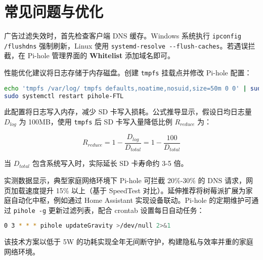 \chapter{常见问题与优化}
广告过滤失效时，首先检查客户端 DNS 缓存。Windows 系统执行 \verb!ipconfig /flushdns! 强制刷新，Linux 使用 \verb!systemd-resolve --flush-caches!。若遇误拦截，在 Pi-hole 管理界面的 \textbf{Whitelist} 添加域名即可。\par
性能优化建议将日志存储于内存磁盘。创建 \verb!tmpfs! 挂载点并修改 Pi-hole 配置：\par
\begin{lstlisting}[language=bash]
echo 'tmpfs /var/log/ tmpfs defaults,noatime,nosuid,size=50m 0 0' | sudo tee -a /etc/fstab
sudo systemctl restart pihole-FTL
\end{lstlisting}
此配置将日志写入内存，减少 SD 卡写入损耗。公式推导显示，假设日均日志量 $D_{log}$ 为 100MB，使用 \verb!tmpfs! 后 SD 卡写入量降低比例 $R_{reduce}$ 为：\par
$$ R_{reduce} = 1 - \frac{D_{log}}{D_{total}} = 1 - \frac{100}{D_{total}} $$\par
当 $D_{total}$ 包含系统写入时，实际延长 SD 卡寿命约 3-5 倍。\par
实测数据显示，典型家庭网络环境下 Pi-hole 可拦截 20\%{}-30\%{} 的 DNS 请求，网页加载速度提升 15\%{} 以上（基于 SpeedTest 对比）。延伸推荐将树莓派扩展为家庭自动化中枢，例如通过 Home Assistant 实现设备联动。Pi-hole 的定期维护可通过 \verb!pihole -g! 更新过滤列表，配合 crontab 设置每日自动任务：\par
\begin{lstlisting}[language=bash]
0 3 * * * pihole updateGravity >/dev/null 2>&1
\end{lstlisting}
该技术方案以低于 5W 的功耗实现全年无间断守护，构建隐私与效率并重的家庭网络环境。\par
